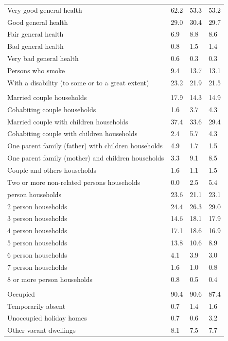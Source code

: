 \documentclass{article}
\begin{document}
\begin{table}[h]
\begin{tabular}{KTTT}
Very good general health & 62.2& 53.3& 53.2\\
Good general health & 29.0& 30.4& 29.7\\
Fair general health & 6.9& 8.8& 8.6\\
Bad general health & 0.8& 1.5& 1.4\\
Very bad general health & 0.6& 0.3& 0.3\\
    \hline
Persons who smoke &  9.4& 13.7& 13.1\\
    \hline
With a disability (to some or to a great extent) & 23.2& 21.9& 21.5\\
\hline
    \\ 
    \hline
Married couple households & 17.9& 14.3& 14.9\\
Cohabiting couple households & 1.6& 3.7& 4.3\\
Married couple with children households & 37.4& 33.6& 29.4\\
Cohabiting couple with children households & 2.4& 5.7& 4.3\\
One parent family (father) with  children households & 4.9& 1.7& 1.5\\
One parent family (mother) and children households & 3.3& 9.1& 8.5\\
Couple and others households  & 1.6& 1.1& 1.5\\
Two or more non-related persons households & 0.0& 2.5& 5.4\\
     person households & 23.6& 21.1& 23.1\\
2 person households & 24.4& 26.3& 29.0\\
3 person households & 14.6& 18.1& 17.9\\
4 person households & 17.1& 18.6& 16.9\\
5 person households & 13.8& 10.6&  8.9\\
6 person households & 4.1& 3.9& 3.0\\
7 person households & 1.6& 1.0& 0.8\\
8 or more person households & 0.8& 0.5& 0.4\\
\hline
    \\ 
    \hline
Occupied & 90.4& 90.6& 87.4\\
Temporarily absent & 0.7& 1.4& 1.6\\
Unoccupied holiday homes & 0.7& 0.6& 3.2\\
Other vacant dwellings & 8.1& 7.5& 7.7\\
\hline
\end{tabular}
\end{table}
\end{document}
